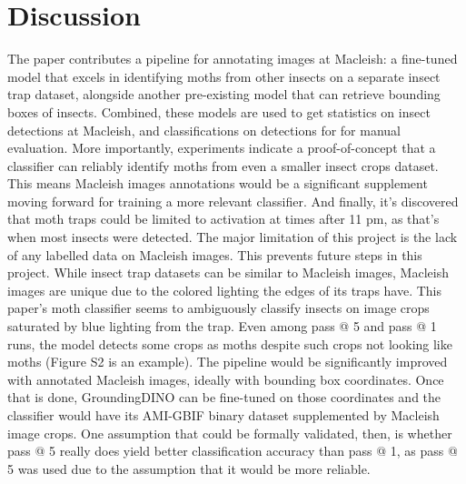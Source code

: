 \documentclass[twocolumn]{article}
\newcommand\tab[1][1cm]{\hspace*{#1}}
\begin{document}
    \section{Discussion} 
    \tab The paper contributes a pipeline for annotating images at Macleish: a fine-tuned model that 
     excels in identifying moths from other insects on a separate insect trap dataset, alongside
    another pre-existing model that can retrieve bounding boxes of insects. Combined, these models are used to get 
    statistics on insect detections at Macleish, and classifications on detections for for manual evaluation. More importantly,
    experiments indicate a proof-of-concept that a classifier can reliably identify moths from even a smaller insect crops dataset. This means 
     Macleish images annotations would be a significant supplement moving forward for training a more relevant classifier. 
     And finally, it's discovered that moth traps could be limited to activation at times after 11 pm,
    as that's when most insects were detected. \newline
    \tab The major limitation of this project is 
    the lack of any labelled data on Macleish images. This prevents future
    steps in this project. While insect trap datasets can be similar to Macleish images, Macleish images are unique
    due to the colored lighting the edges of its traps have.
     This paper's moth classifier seems to ambiguously classify insects on image crops saturated by blue
     lighting from the trap. Even among pass @ 5 and pass @ 1 runs, the model detects some crops as moths despite such crops not looking like
     moths (Figure S2 is an example). The pipeline would be significantly improved with annotated Macleish images, ideally with bounding box coordinates. 
     Once that is done, GroundingDINO can be 
     fine-tuned on those coordinates and the classifier would have its AMI-GBIF binary dataset supplemented by Macleish image crops. 
     One assumption that could be formally validated, then, is whether pass @ 5 really does yield better classification accuracy than pass @ 1,
     as pass @ 5 was used due to the assumption that it would be more reliable.
    \newline
    \newline
    \newline
    \\[20\baselineskip]
\end{document}
